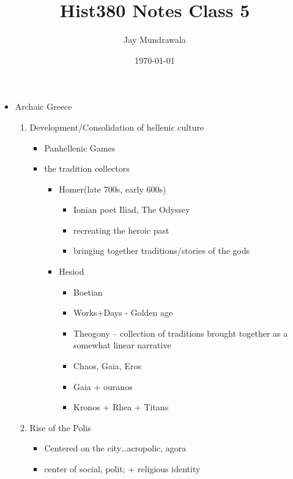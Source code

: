 \documentclass[11pt, a4paper]{article}
\begin{document}
\title{Hist380 Notes Class 5}
\author{Jay Mundrawala}
\date{\today}
\maketitle

\begin{itemize}
  \item Archaic Greece
    \begin{enumerate}
      \item Development/Consolidation of hellenic culture
        \begin{itemize}
          \item Panhellenic Games
          \item the tradition collectors
            \begin{itemize}
              \item Homer(late 700s, early 600s)
                \begin{itemize}
                  \item Ionian poet
                    Iliad, The Odyssey
                  \item recreating the heroic past
                  \item bringing together traditions/stories of the gods
                \end{itemize}
              \item Hesiod
                \begin{itemize}
                  \item Boetian
                  \item Works+Days - Golden age
                  \item Theogony -- collection of traditions brought together as a somewhat linear narrative
                  \item Chaos, Gaia, Eros
                  \item Gaia + ouranos
                  \item Kronos + Rhea + Titans
                \end{itemize}
            \end{itemize}
        \end{itemize}
      \item Rise of the Polis
        \begin{itemize}
          \item Centered on the city\dots acropolic, agora
          \item center of social, polit; + religious identity

\end{itemize}
\end{enumerate}
\end{itemize}
\end{document}
